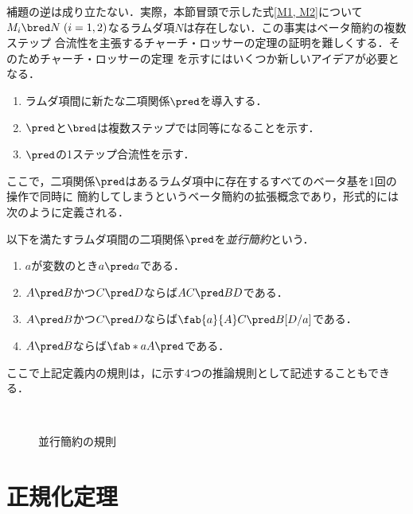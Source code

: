 \documentclass[uplatex,dvipdfmx,report,fleqn]{jsbook}
\begin{document}
補題の逆は成り立たない．実際，本節冒頭で示した式\eqref{M1, M2}について
$M_i\bred N\;(i=1,2)$なるラムダ項$N$は存在しない．この事実はベータ簡約の複数ステップ
合流性を主張するチャーチ・ロッサーの定理の証明を難しくする．そのためチャーチ・ロッサーの定理
を示すにはいくつか新しいアイデアが必要となる．
%
\begin{enumerate}
\item ラムダ項間に新たな二項関係$\pred$を導入する．
\item $\pred$と$\bred$は複数ステップでは同等になることを示す．
\item $\pred$の1ステップ合流性を示す．
\end{enumerate}
%
ここで，二項関係$\pred$はあるラムダ項中に存在するすべてのベータ基を1回の操作で同時に
簡約してしまうというベータ簡約の拡張概念であり，形式的には次のように定義される．
%
\begin{definition}[並行簡約]
以下を満たすラムダ項間の二項関係$\pred$を\emph{並行簡約}という．
%
\begin{enumerate}
\item $a$が変数のとき$a\pred a$である．
\item $A\pred B$かつ$C\pred D$ならば$AC\pred BD$である．
\item $A\pred B$かつ$C\pred D$ならば$\fab{a}{A}C\pred B[D/a]$である．
\item $A\pred B$ならば$\fab*{a}{A}\pred$である．
\end{enumerate}
\end{definition}
%
ここで上記定義内の規則は，に示す4つの推論規則として記述することもできる．
%
\begin{figure}
\centering
\begin{minipage}{.35\textwidth}
\centering
{}
\end{minipage}
\begin{minipage}{.35\textwidth}
\centering
{}
\end{minipage}
%
\\
%
\begin{minipage}{.35\textwidth}
\centering
{}
\end{minipage}
\begin{minipage}{.35\textwidth}
\centering
{}
\end{minipage}
\caption{並行簡約の規則}
\end{figure}

\section{正規化定理}

\NeedsRevision
\end{document}

